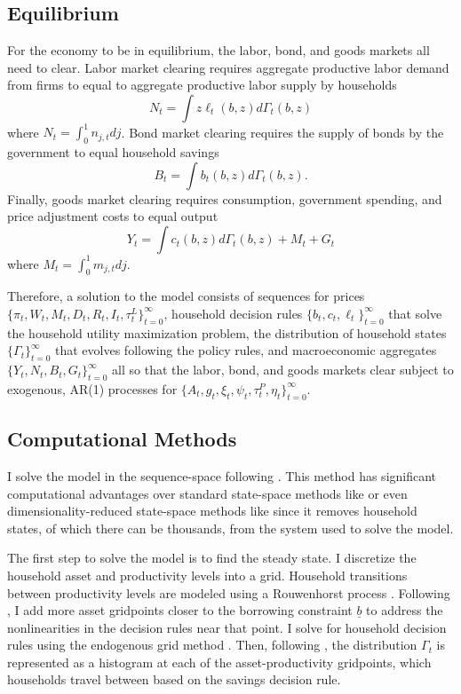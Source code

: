 \subsection{Equilibrium}

For the economy to be in equilibrium, the labor, bond, and goods markets all need to clear. Labor market clearing requires aggregate productive labor demand from firms to equal to aggregate productive labor supply by households
\begin{equation*}
    N_t = \int z \ell_t (b, z) d \Gamma_t (b, z)
\end{equation*}
where $N_t = \int_0^1 n_{j, t} dj$. Bond market clearing requires the supply of bonds by the government to equal household savings
\begin{equation*}
    B_t = \int b_t (b, z) d \Gamma_t (b, z).
\end{equation*}
Finally, goods market clearing requires consumption, government spending, and price adjustment costs to equal output
\begin{equation*}
    Y_t = \int c_t (b, z) d \Gamma_t (b, z) + M_t + G_t
\end{equation*}
where $M_t = \int_0^1 m_{j, t} d j$.

Therefore, a solution to the model consists of sequences for prices $\{\pi_t, W_t, M_t, D_t, R_t, I_t, \tau_t^L\}_{t = 0}^\infty$, household decision rules $\{b_t, c_t, \ell_t\}_{t = 0}^\infty$ that solve the household utility maximization problem, the distribution of household states $\{\Gamma_t\}_{t = 0}^\infty$ that evolves following the policy rules, and macroeconomic aggregates $\{Y_t, N_t, B_t, G_t\}_{t = 0}^\infty$ all so that the labor, bond, and goods markets clear subject to exogenous, AR(1) processes for $\{A_t, g_t, \xi_t, \psi_t, \tau_t^P, \eta_t\}_{t = 0}^\infty$.


\subsection{Computational Methods}

I solve the model in the sequence-space following \textcite{auclert2021using}. This method has significant computational advantages over standard state-space methods like \textcite{reiter2009solving} or even dimensionality-reduced state-space methods like \textcite{bayer2018solving} since it removes household states, of which there can be thousands, from the system used to solve the model.

The first step to solve the model is to find the steady state. I discretize the household asset and productivity levels into a grid. Household transitions between productivity levels are modeled using a Rouwenhorst process \autocite{kopecky2010finite}. Following \textcite{reiter2009solving}, I add more asset gridpoints closer to the borrowing constraint $\underline{b}$ to address the nonlinearities in the decision rules near that point. I solve for household decision rules using the endogenous grid method \autocite{carroll2006method}. Then, following \textcite{young2010solving}, the distribution $\Gamma_t$ is represented as a histogram at each of the asset-productivity gridpoints, which households travel between based on the savings decision rule.

